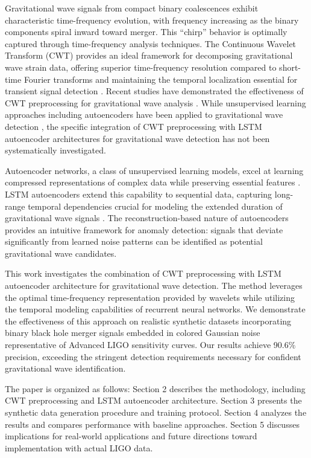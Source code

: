 \documentclass{iopjournal}
\begin{document}
Gravitational wave signals from compact binary coalescences exhibit characteristic time-frequency evolution, with frequency increasing as the binary components spiral inward toward merger. This ``chirp'' behavior is optimally captured through time-frequency analysis techniques. The Continuous Wavelet Transform (CWT) provides an ideal framework for decomposing gravitational wave strain data, offering superior time-frequency resolution compared to short-time Fourier transforms and maintaining the temporal localization essential for transient signal detection \cite{chatterji2004multiresolution}. Recent studies have demonstrated the effectiveness of CWT preprocessing for gravitational wave analysis \cite{powell2015classification}. While unsupervised learning approaches including autoencoders have been applied to gravitational wave detection \cite{torres2024anomaly, lopez2022deep}, the specific integration of CWT preprocessing with LSTM autoencoder architectures for gravitational wave detection has not been systematically investigated.

Autoencoder networks, a class of unsupervised learning models, excel at learning compressed representations of complex data while preserving essential features \cite{hinton2006reducing}. LSTM autoencoders extend this capability to sequential data, capturing long-range temporal dependencies crucial for modeling the extended duration of gravitational wave signals \cite{hochreiter1997long}. The reconstruction-based nature of autoencoders provides an intuitive framework for anomaly detection: signals that deviate significantly from learned noise patterns can be identified as potential gravitational wave candidates.

This work investigates the combination of CWT preprocessing with LSTM autoencoder architecture for gravitational wave detection. The method leverages the optimal time-frequency representation provided by wavelets while utilizing the temporal modeling capabilities of recurrent neural networks. We demonstrate the effectiveness of this approach on realistic synthetic datasets incorporating binary black hole merger signals embedded in colored Gaussian noise representative of Advanced LIGO sensitivity curves. Our results achieve 90.6\% precision, exceeding the stringent detection requirements necessary for confident gravitational wave identification.

The paper is organized as follows: Section 2 describes the methodology, including CWT preprocessing and LSTM autoencoder architecture. Section 3 presents the synthetic data generation procedure and training protocol. Section 4 analyzes the results and compares performance with baseline approaches. Section 5 discusses implications for real-world applications and future directions toward implementation with actual LIGO data.
\end{document}
